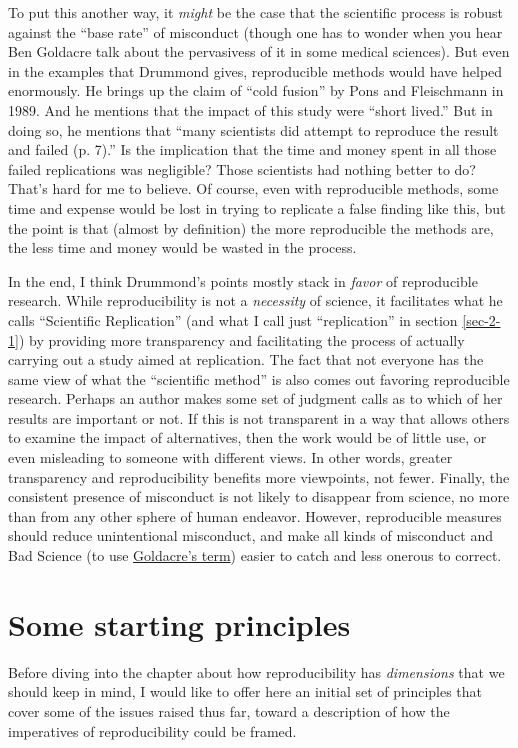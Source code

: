 \documentclass{book}
\begin{document}
To put this another way, it \emph{might} be the case that the scientific process is robust against the ``base rate'' of misconduct (though one has to wonder when you hear Ben Goldacre talk about the pervasivess of it in some medical sciences).  But even in the examples that Drummond gives, reproducible methods would have helped enormously. He brings up the claim of ``cold fusion'' by Pons and Fleischmann in 1989. And he mentions that the impact of this study were ``short lived.''  But in doing so, he mentions that ``many scientists did attempt to reproduce the result and failed (p. 7).'' Is the implication that the time and money spent in all those failed replications was negligible? Those scientists had nothing better to do? That's hard for me to believe. Of course, even with reproducible methods, some time and expense would be lost in trying to replicate a false finding like this, but the point is that (almost by definition) the more reproducible the methods are, the less time and money would be wasted in the process.

In the end, I think Drummond's points mostly stack in \emph{favor} of reproducible research. While reproducibility is not a \emph{necessity} of science, it facilitates what he calls ``Scientific Replication'' (and what I call just ``replication'' in section \ref{sec-2-1}) by providing more transparency and facilitating the process of actually carrying out a study aimed at replication. The fact that not everyone has the same view of what the ``scientific method'' is also comes out favoring reproducible research.  Perhaps an author makes some set of judgment calls as to which of her results are important or not. If this is not transparent in a way that allows others to examine the impact of alternatives, then the work would be of little use, or even misleading to someone with different views. In other words, greater transparency and reproducibility benefits more viewpoints, not fewer. Finally, the consistent presence of misconduct is not likely to disappear from science, no more than from any other sphere of human endeavor. However, reproducible measures should reduce unintentional misconduct, and make all kinds of misconduct and Bad Science (to use \href{http://www.badscience.net/}{Goldacre's term}) easier to catch and less onerous to correct.
\section{Some starting principles}
\label{sec-2-5}

Before diving into the chapter about how reproducibility has \emph{dimensions} that we should keep in mind, I would like to offer here an initial set of principles that cover some of the issues raised thus far, toward a description of how the imperatives of reproducibility could be framed.
\end{document}
